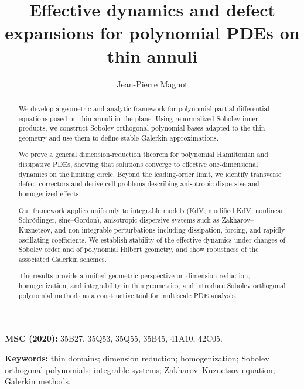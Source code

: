 \documentclass[11pt]{amsart}
\theoremstyle{plain}
\theoremstyle{definition}
\theoremstyle{remark}
\theoremstyle{remark}
\begin{document}
\title{Effective dynamics and defect expansions for polynomial PDEs on thin annuli}
\author{Jean-Pierre Magnot}
\address{$^*$  Univ. Angers, CNRS, LAREMA, SFR MATHSTIC, F-49000 Angers, France ;\\ 
Lepage Research Institute, 17 novembra 1, 081 16 Presov, Slovakia;
	\\ and \\  Lyc\'ee Jeanne d'Arc, \\ Avenue de Grande Bretagne, \\ 63000 Clermont-Ferrand, France}
\date{}

\maketitle

\begin{abstract}
We develop a geometric and analytic framework for polynomial partial differential equations posed on thin annuli in the plane.
Using renormalized Sobolev inner products, we construct Sobolev orthogonal polynomial bases adapted to the thin geometry and use them to define stable Galerkin approximations.

We prove a general dimension-reduction theorem for polynomial Hamiltonian and dissipative PDEs, showing that solutions converge to effective one-dimensional dynamics on the limiting circle.
Beyond the leading-order limit, we identify transverse defect correctors and derive cell problems describing anisotropic dispersive and homogenized effects.

Our framework applies uniformly to integrable models (KdV, modified KdV, nonlinear Schr\"odinger, sine--Gordon), anisotropic dispersive systems such as Zakharov--Kuznetsov, and non-integrable perturbations including dissipation, forcing, and rapidly oscillating coefficients.
We establish stability of the effective dynamics under changes of Sobolev order and of polynomial Hilbert geometry, and show robustness of the associated Galerkin schemes.

The results provide a unified geometric perspective on dimension reduction, homogenization, and integrability in thin geometries, and introduce Sobolev orthogonal polynomial methods as a constructive tool for multiscale PDE analysis.
\end{abstract}

\noindent\textbf{MSC (2020):} 35B27, 35Q53, 35Q55, 35B45, 41A10, 42C05.

\noindent\textbf{Keywords:} thin domains; dimension reduction; homogenization; Sobolev orthogonal polynomials; integrable systems; Zakharov--Kuznetsov equation; Galerkin methods.
\end{document}
